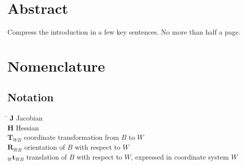 
 \setcounter{tocdepth}{2}
 \tableofcontents
 \cleardoublepage






\chapter*{Abstract}

  Compress the introduction in a few key sentences. No more than half a page.

 \cleardoublepage


\chapter*{Nomenclature}\label{chap:symbole}

\section*{Notation}
  \begin{tabbing}
    \hspace*{1.6cm}   \= \kill
    $\mathbf{J}$       \> Jacobian \\[0.5ex]
    $\mathbf{H}$       \> Hessian \\[0.5ex]
    $\mathbf{T}_{WB}$  \> coordinate transformation from $B$ to $W$ \\[0.5ex]
    $\mathbf{R}_{WB}$  \> orientation of $B$ with respect to $W$ \\[0.5ex]
    $_W\mathbf{t}_{WB}$\> translation of $B$ with respect to $W$, expressed in coordinate system $W$ \\[0.5ex]
  \end{tabbing}
  
